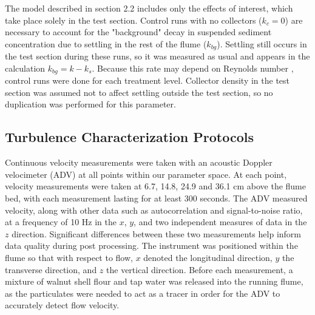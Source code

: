 \documentclass{scrreprt}
\begin{document}
The model described in section 2.2 includes only the effects of interest, which take place solely in the test section. Control runs with no collectors ($k_c = 0$) are necessary to account for the "background" decay in suspended sediment concentration due to settling in the rest of the flume ($k_{bg}$). Settling still occurs in the test section during these runs, so it was measured as usual and appears in the calculation $k_{bg} = k - k_s$. Because this rate may depend on Reynolds number \citep{Nielsen_1993, Jacobs_2016, Wang_2018}, control runs were done for each treatment level. Collector density in the test section was assumed not to affect settling outside the test section, so no duplication was performed for this parameter.


\subsection{Turbulence Characterization Protocols}
Continuous velocity measurements were taken with an acoustic Doppler velocimeter (ADV) at all points within our parameter space. At each point, velocity measurements were taken at 6.7, 14.8, 24.9 and 36.1 cm above the flume bed, with each measurement lasting for at least 300 seconds. The ADV measured velocity, along with other data such as autocorrelation and signal-to-noise ratio, at a frequency of 10 Hz in the $x$, $y$, and two independent measures of data in the $z$ direction. Significant differences between these two measurements help inform data quality during post processing. The instrument was positioned within the flume so that with respect to flow, $x$ denoted the longitudinal direction, $y$ the transverse direction, and $z$ the vertical direction. Before each measurement, a mixture of walnut shell flour and tap water was released into the running flume, as the particulates were needed to act as a tracer in order for the ADV to accurately detect flow velocity.
\end{document}
